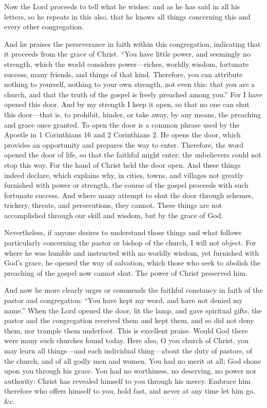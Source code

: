 Now the Lord proceeds to tell what he wishes: and as he has said in all his letters, so he repeats in this also, that he knows all things concerning this and every other congregation.

And he praises the perseverance in faith within this congregation, indicating that it proceeds from the grace of Christ. “You have little power, and seemingly no strength, which the world considers power—riches, worldly wisdom, fortunate success, many friends, and things of that kind. Therefore, you can attribute nothing to yourself, nothing to your own strength, not even this: that you are a church, and that the truth of the gospel is freely preached among you.” For I have opened this door. And by my strength I keep it open, so that no one can shut this door—that is, to prohibit, hinder, or take away, by any means, the preaching and grace once granted. To open the door is a common phrase used by the Apostle in 1 Corinthians 16 and 2 Corinthians 2. He opens the door, which provides an opportunity and prepares the way to enter. Therefore, the word opened the door of life, so that the faithful might enter; the unbelievers could not stop this way. For the hand of Christ held the door open. And these things indeed declare, which explains why, in cities, towns, and villages not greatly furnished with power or strength, the course of the gospel proceeds with such fortunate success. And where many attempt to shut the door through schemes, trickery, threats, and persecutions, they cannot. These things are not accomplished through our skill and wisdom, but by the grace of God.

Nevertheless, if anyone desires to understand those things and what follows particularly concerning the pastor or bishop of the church, I will not object. For where he was humble and instructed with no worldly wisdom, yet furnished with God’s grace, he opened the way of salvation, which those who seek to abolish the preaching of the gospel now cannot shut. The power of Christ preserved him.

And now he more clearly urges or commends the faithful constancy in faith of the pastor and congregation: “You have kept my word, and have not denied my name.” When the Lord opened the door, lit the lamp, and gave spiritual gifts, the pastor and the congregation received them and kept them, and so did not deny them, nor trample them underfoot. This is excellent praise. Would God there were many such churches found today. Here also, O you church of Christ, you may learn all things—and each individual thing—about the duty of pastors, of the church, and of all godly men and women. You had no merit at all; God shone upon you through his grace. You had no worthiness, no deserving, no power nor authority: Christ has revealed himself to you through his mercy. Embrace him therefore who offers himself to you, hold fast, and never at any time let him go. \&c.

